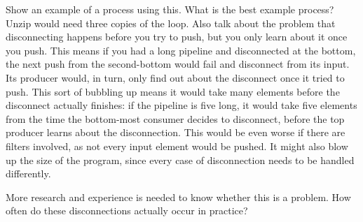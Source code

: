 Show an example of a process using this. What is the best example process? Unzip would need three copies of the loop.
Also talk about the problem that disconnecting happens before you try to push, but you only learn about it once you push.
This means if you had a long pipeline and disconnected at the bottom, the next push from the second-bottom would fail and disconnect from its input.
Its producer would, in turn, only find out about the disconnect once it tried to push.
This sort of bubbling up means it would take many elements before the disconnect actually finishes: if the pipeline is five long, it would take five elements from the time the bottom-most consumer decides to disconnect, before the top producer learns about the disconnection.
This would be even worse if there are filters involved, as not every input element would be pushed.
It might also blow up the size of the program, since every case of disconnection needs to be handled differently.

More research and experience is needed to know whether this is a problem.
How often do these disconnections actually occur in practice?

